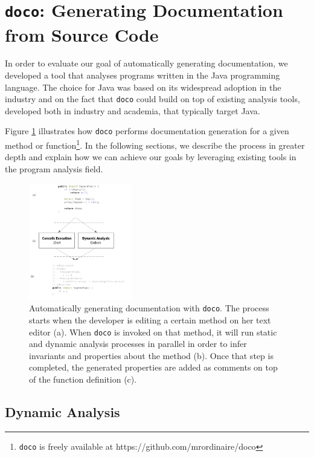 \section{\texttt{doco}: Generating Documentation from Source Code}

In order to evaluate our goal of automatically generating documentation, we developed a tool that analyses programs written in the Java programming language. The choice for Java was based on its widespread adoption in the industry and on the fact that \texttt{doco} could build on top of existing analysis tools, developed both in industry and academia, that typically target Java.

Figure \ref{fig:flow} illustrates how \texttt{doco} performs documentation generation for a given method or function\footnote{\texttt{doco} is freely available at https://github.com/mrordinaire/doco}. In the following sections, we describe the process in greater depth and explain how we can achieve our goals by leveraging existing tools in the program analysis field.

\begin{figure}[h]
  \centering
    \includegraphics[width=0.4\textwidth]{doco_flow.png}
    \caption{Automatically generating documentation with \texttt{doco}. The process starts when the developer is editing a certain method on her text editor (a). When \texttt{doco} is invoked on that method, it will run static and dynamic analysis processes in parallel in order to infer invariants and properties about the method (b). Once that step is completed, the generated properties are added as comments on top of the function definition (c).}
    \label{fig:flow}
\end{figure}

\subsection{Dynamic Analysis}

